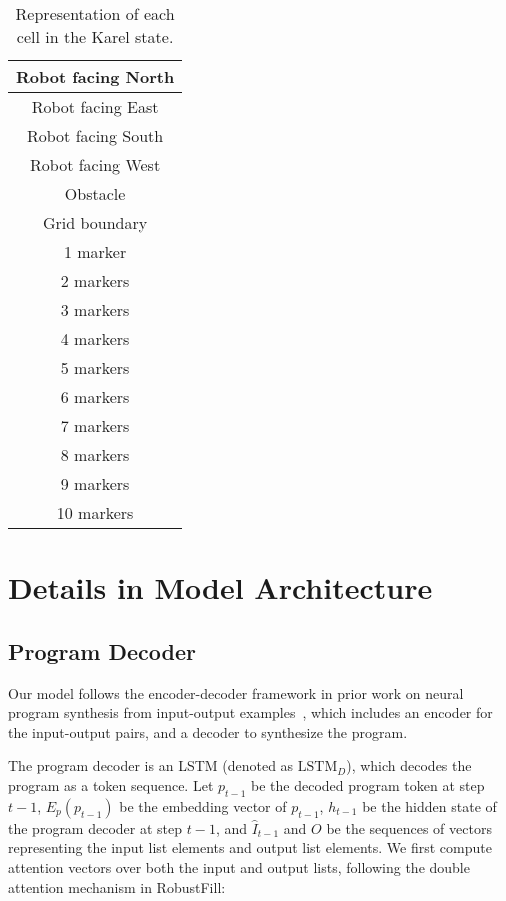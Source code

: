 \begin{table}[h]
    \centering
    \begin{tabular}{|c|}
        \hline
        Robot facing North \\
        \hline
        Robot facing East \\
        \hline
        Robot facing South \\
        \hline
        Robot facing West \\
        \hline
        Obstacle \\
        \hline
        Grid boundary \\
        \hline
        1 marker \\
        \hline
        2 markers \\
        \hline
        3 markers \\
        \hline
        4 markers \\
        \hline
        5 markers \\
        \hline
        6 markers \\
        \hline
        7 markers \\
        \hline
        8 markers \\
        \hline
        9 markers \\
        \hline
        10 markers \\
        \hline
    \end{tabular}
    \caption{Representation of each cell in the Karel state.}
    \label{tab:karel-state}
\end{table}

\section{Details in Model Architecture}
\label{app:model-architecture}
\subsection{Program Decoder}
\label{app:program-decoder}

Our model follows the encoder-decoder framework in prior work on neural program synthesis from input-output examples~\cite{devlin2017robustfill,bunel2018leveraging}, which includes an encoder for the input-output pairs, and a decoder to synthesize the program.

The program decoder is an LSTM (denoted as $\mathrm{LSTM}_D$), which decodes the program as a token sequence. Let $p_{t-1}$ be the decoded program token at step $t-1$, $E_p(p_{t-1})$ be the embedding vector of $p_{t-1}$, $h_{t-1}$ be the hidden state of the program decoder at step $t-1$, and $\hat I_{t-1}$ and $O$ be the sequences of vectors representing the input list elements and output list elements. We first compute attention vectors over both the input and output lists, following the double attention mechanism in RobustFill:

